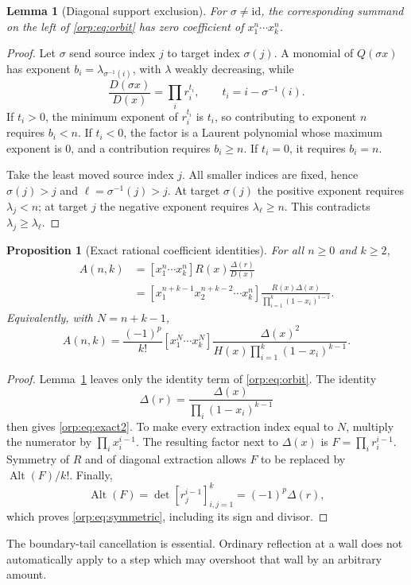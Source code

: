\documentclass[11pt]{article}
\newtheorem{proposition}[theorem]{Proposition}
\newtheorem{lemma}[theorem]{Lemma}
\theoremstyle{remark}\newtheorem{remark}[theorem]{Remark}
\newcommand{\Alt}{\operatorname{Alt}}
\begin{document}
\begin{lemma}[Diagonal support exclusion]\label{orp:lem:support}
For $\sigma\ne\mathrm{id}$, the corresponding summand on the left of \eqref{orp:eq:orbit} has zero coefficient of $x_1^n\cdots x_k^n$.
\end{lemma}
\begin{proof}
Let $\sigma$ send source index $j$ to target index $\sigma(j)$. A monomial of $Q(\sigma x)$ has exponent $b_i=\lambda_{\sigma^{-1}(i)}$, with $\lambda$ weakly decreasing, while
\[
 \frac{D(\sigma x)}{D(x)}=\prod_i r_i^{t_i},\qquad t_i=i-\sigma^{-1}(i).
\]
If $t_i>0$, the minimum exponent of $r_i^{t_i}$ is $t_i$, so contributing to exponent $n$ requires $b_i<n$. If $t_i<0$, the factor is a Laurent polynomial whose maximum exponent is $0$, and a contribution requires $b_i\ge n$. If $t_i=0$, it requires $b_i=n$.

Take the least moved source index $j$. All smaller indices are fixed, hence $\sigma(j)>j$ and $\ell=\sigma^{-1}(j)>j$. At target $\sigma(j)$ the positive exponent requires $\lambda_j<n$; at target $j$ the negative exponent requires $\lambda_\ell\ge n$. This contradicts $\lambda_j\ge\lambda_\ell$.
\end{proof}

\begin{proposition}[Exact rational coefficient identities]\label{orp:prop:exact}
For all $n\ge0$ and $k\ge2$,
\begin{align}
 A(n,k)
 &= [x_1^n\cdots x_k^n]R(x)\frac{\Delta(r)}{D(x)} \label{orp:eq:exact1}\\
 &= [x_1^{n+k-1}x_2^{n+k-2}\cdots x_k^n]
 \frac{R(x)\Delta(x)}{\prod_{i=1}^k(1-x_i)^{i-1}}. \label{orp:eq:exact2}
\end{align}
Equivalently, with $N=n+k-1$,
\begin{equation}\label{orp:eq:symmetric}
 A(n,k)=\frac{(-1)^p}{k!}[x_1^N\cdots x_k^N]
 \frac{\Delta(x)^2}{H(x)\prod_{i=1}^k(1-x_i)^{k-1}}.
\end{equation}
\end{proposition}
\begin{proof}
Lemma~\ref{orp:lem:support} leaves only the identity term of \eqref{orp:eq:orbit}. The identity
\[
 \Delta(r)=\frac{\Delta(x)}{\prod_i(1-x_i)^{k-1}}
\]
then gives \eqref{orp:eq:exact2}. To make every extraction index equal to $N$, multiply the numerator by $\prod_i x_i^{i-1}$. The resulting factor next to $\Delta(x)$ is $F=\prod_i r_i^{i-1}$. Symmetry of $R$ and of diagonal extraction allows $F$ to be replaced by $\Alt(F)/k!$. Finally,
\[
 \Alt(F)=\det[r_j^{i-1}]_{i,j=1}^k=(-1)^p\Delta(r),
\]
which proves \eqref{orp:eq:symmetric}, including its sign and divisor.
\end{proof}
The boundary-tail cancellation is essential. Ordinary reflection at a wall does not automatically apply to a step which may overshoot that wall by an arbitrary amount.
\end{document}
